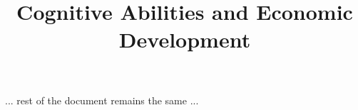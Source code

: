 \documentclass{article}
\title{Cognitive Abilities and Economic Development}
\author{}
\date{}
\begin{document}
\maketitle

... rest of the document remains the same ...
\end{document}
